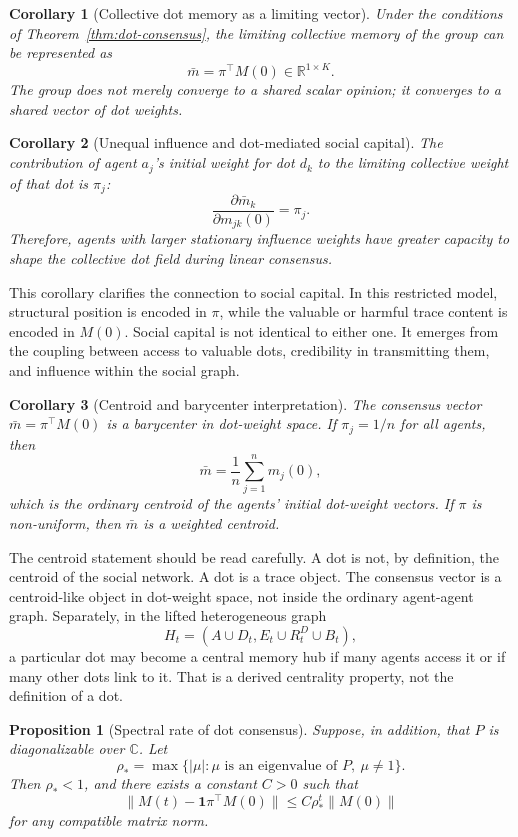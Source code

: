 \documentclass[11pt]{article}
\newtheorem{proposition}{Proposition}
\newtheorem{corollary}{Corollary}
\theoremstyle{remark}
\begin{document}
\begin{corollary}[Collective dot memory as a limiting vector]
Under the conditions of Theorem~\ref{thm:dot-consensus}, the limiting
collective memory of the group can be represented as
$$
\bar m=\pi^\top M(0)\in\mathbb{R}^{1\times K}.
$$
The group does not merely converge to a shared scalar opinion; it
converges to a shared vector of dot weights.
\end{corollary}


\begin{corollary}[Unequal influence and dot-mediated social capital]
The contribution of agent $a_j$'s initial weight for dot $d_k$ to the
limiting collective weight of that dot is $\pi_j$:
$$
\frac{\partial \bar m_k}{\partial m_{jk}(0)}=\pi_j.
$$
Therefore, agents with larger stationary influence weights have greater
capacity to shape the collective dot field during linear consensus.
\end{corollary}


This corollary clarifies the connection to social capital. In this
restricted model, structural position is encoded in $\pi$, while the
valuable or harmful trace content is encoded in $M(0)$. Social capital
is not identical to either one. It emerges from the coupling between
access to valuable dots, credibility in transmitting them, and influence
within the social graph.

\begin{corollary}[Centroid and barycenter interpretation]
The consensus vector $\bar m=\pi^\top M(0)$ is a barycenter in dot-weight
space. If $\pi_j=1/n$ for all agents, then
$$
\bar m=\frac{1}{n}\sum_{j=1}^n m_j(0),
$$
which is the ordinary centroid of the agents' initial dot-weight
vectors. If $\pi$ is non-uniform, then $\bar m$ is a weighted centroid.
\end{corollary}


The centroid statement should be read carefully. A dot is not, by
definition, the centroid of the social network. A dot is a trace object.
The consensus vector is a centroid-like object in dot-weight space, not
inside the ordinary agent-agent graph. Separately, in the lifted
heterogeneous graph
$$
H_t=(A\cup D_t,E_t\cup R_t^D\cup B_t),
$$
a particular dot may become a central memory hub if many agents access
it or if many other dots link to it. That is a derived centrality
property, not the definition of a dot.

\begin{proposition}[Spectral rate of dot consensus]
Suppose, in addition, that $P$ is diagonalizable over $\mathbb{C}$. Let
$$
\rho_* = \max\{ |\mu| : \mu \text{ is an eigenvalue of }P,\ \mu\neq 1\}.
$$
Then $\rho_*<1$, and there exists a constant $C>0$ such that
$$
\|M(t)-\mathbf{1}\pi^\top M(0)\|\leq C\rho_*^t\|M(0)\|
$$
for any compatible matrix norm.
\end{proposition}
\end{document}
